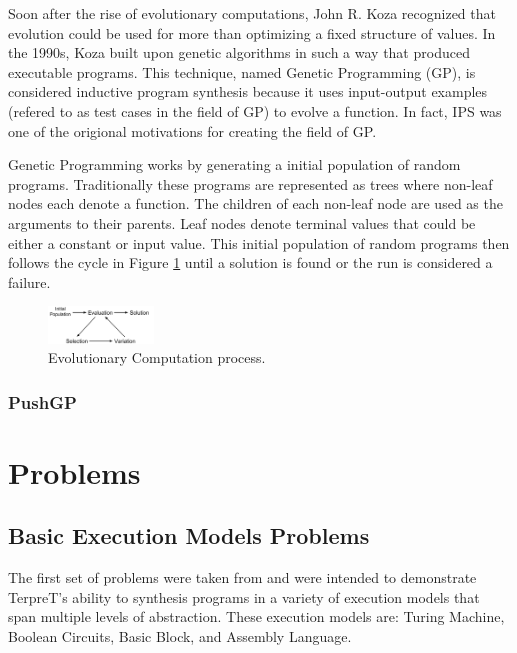 Soon after the rise of evolutionary computations, John R. Koza recognized that evolution could be used for more than optimizing a fixed structure of values. In the 1990s, Koza built upon genetic algorithms in such a way that produced executable programs. This technique, named Genetic Programming (GP), is considered inductive program synthesis because it uses input-output examples (refered to as test cases in the field of GP) to evolve a function. In fact, IPS was one of the origional motivations for creating the field of GP\cite{Koza1992}. 

Genetic Programming works by generating a initial population of random programs. Traditionally these programs are represented as trees where non-leaf nodes each denote a function. The children of each non-leaf node are used as the arguments to their parents. Leaf nodes denote terminal values that could be either a constant or input value. This initial population of random programs then follows the cycle in Figure \ref{fig:evo}  until a solution is found or the run is considered a failure.

\begin{figure}[t]
\centering
\includegraphics[width=0.25\textwidth]{res/EvolutionCycle}
\caption{Evolutionary Computation process.}
\label{fig:evo}
\end{figure}

\subsubsection{PushGP}


\section{Problems}
\subsection{Basic Execution Models Problems}
The first set of problems were taken from \cite{Gaunt2016} and were intended to demonstrate TerpreT's ability to synthesis programs in a variety of execution models that span multiple levels of abstraction. These execution models are: Turing Machine, Boolean Circuits, Basic Block, and Assembly Language. 

